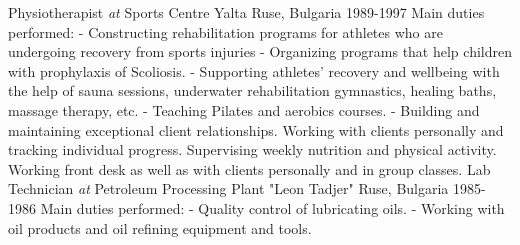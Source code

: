 \vspace{+3mm}
\cventry
{Physiotherapist \textit{at}  Sports Centre Yalta}
{Ruse, Bulgaria 1989-1997}
{
Main duties performed: 
\newline
\hspace{3ex} - Constructing rehabilitation programs for athletes who are undergoing recovery from sports injuries
\newline
\hspace{3ex} - Organizing programs that help children with prophylaxis of Scoliosis.   
\newline
\hspace{3ex} - Supporting athletes' recovery and wellbeing with the help of sauna sessions, underwater rehabilitation gymnastics, 
healing baths, massage therapy, etc.
\newline
\hspace{3ex} - Teaching Pilates and aerobics courses.
\newline
\hspace{3ex} - Building and maintaining exceptional client relationships. Working with clients personally and tracking individual progress. Supervising weekly nutrition and physical activity. Working front desk as well as with clients personally and in group classes. 
}
\vspace{+3mm}
\cventry
{Lab Technician \textit{at} Petroleum Processing Plant "Leon Tadjer"}
{Ruse, Bulgaria 1985-1986}
{
Main duties performed: 
\newline
\hspace{3ex} - Quality control of lubricating oils.
\newline
\hspace{3ex} - Working with oil products and oil refining equipment and tools.
}